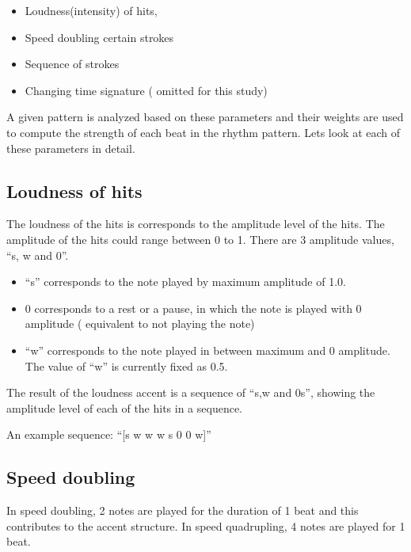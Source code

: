 \begin{itemize}

\item Loudness(intensity) of hits, 
\item Speed doubling certain strokes 
\item Sequence of strokes
\item Changing time signature ( omitted for this study)

\end{itemize}

A given pattern is analyzed based on these parameters and their weights are used to compute the strength of each beat in the rhythm pattern. Lets look at each of these parameters in detail.

\subsection{Loudness of hits}

The loudness of the hits is corresponds to the amplitude level of the hits. The amplitude of the hits could range between 0 to 1. There are 3 amplitude values, ``s, w and 0''.

\begin{itemize}

\item  ``s'' corresponds to the note played by maximum amplitude of 1.0.

\item 0 corresponds to a rest or a pause, in which the note is played with 0 amplitude ( equivalent to not playing the note)

\item ``w'' corresponds to the note played in between maximum and 0 amplitude. The value of ``w'' is currently fixed as 0.5.

\end{itemize}

The result of the loudness accent is a sequence of ``s,w and 0s'', showing the amplitude level of each of the hits in a sequence. 

An example sequence: ``[s w w w s 0 0 w]''

\subsection{Speed doubling}

In speed doubling, 2 notes are played for the duration of 1 beat and this contributes to the accent structure. In speed quadrupling, 4 notes are played for 1 beat.

